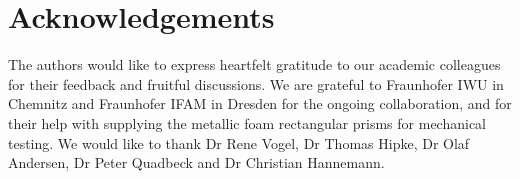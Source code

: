 \documentclass[review]{elsarticle}
\begin{document}









\printnomenclature[1.5cm]

\section*{Acknowledgements}

The authors would like to express heartfelt gratitude to our academic colleagues for their feedback and fruitful discussions. We are grateful to Fraunhofer IWU in Chemnitz and Fraunhofer IFAM in Dresden for the ongoing collaboration, and for their help with supplying the metallic foam rectangular prisms for mechanical testing. We would like to thank Dr Rene Vogel, Dr Thomas Hipke, Dr Olaf Andersen, Dr Peter Quadbeck and Dr Christian Hannemann.
\end{document}
